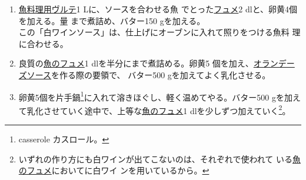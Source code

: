 \begin{recette}
\begin{enumerate}
\def\labelenumi{\arabic{enumi}.}
\item
  \protect\hyperlink{veloute-de-poisson}{魚料理用ヴルテ}1
  Lに、ソースを合わせる魚
  でとった\protect\hyperlink{fumet-de-poisson}{フュメ}2
  dlと、卵黄4個を加える。\deuxtiers{}量 まで煮詰め、バター150
  gを加える。\\
  この「白ワインソース」は、仕上げにオーブンに入れて照りをつける魚料
  理に合わせる。
\item
  良質の\protect\hyperlink{fumet-de-poisson}{魚のフュメ}1
  dlを半分にまで煮詰める。卵黄5
  個を加え、\protect\hyperlink{sauce-hollandaise}{オランデーズソース}を作る際の要領で、
  バター500 gを加えてよく乳化させる。
\item
  卵黄5個を片手鍋\footnote{casserole カスロール。}に入れて溶きほぐし、軽く温めてやる。バター500
  gを加えて乳化させていく途中で、上等な\protect\hyperlink{fumet-de-poisson}{魚のフュメ}1
  dlを少しずつ加えていく\footnote{いずれの作り方にも白ワインが出てこないのは、それぞれで使われて
    いる\protect\hyperlink{fumet-de-poisson}{魚のフュメ}においてに白ワイ
    ンを用いているから。}。
\end{enumerate}
\end{recette}